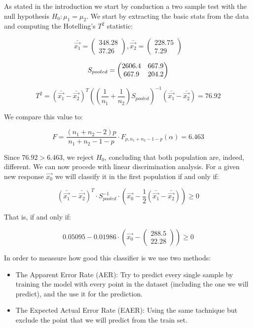 \documentclass[11pt,a4paper]{article}
\begin{document}
	As stated in the introduction we start by conduction a two sample test with the null hypothesis $H_0: \mu_1 = \mu_2$. We start by extracting the basic stats from the data and computing the Hotelling's $T^2$ statistic:
	
	$$ \bar{\vec{x_1}} = 
	\begin{pmatrix}
	348.28  \\         
	37.26
	\end{pmatrix} 
	, \bar{\vec{x_2}} = 
	\begin{pmatrix}
	228.75  \\         
	7.29
	\end{pmatrix} 
	$$
	
	$$ S_{pooled} = 
	\begin{pmatrix}
		\multicolumn{1}{c}{2606.4} & \multicolumn{1}{c}{667.9} \\
		667.9                      & 204.2                    
	\end{pmatrix} 
	$$ 
	
	$$ T^2 = (\bar{\vec{x_1}} - \bar{\vec{x_2}})^T ((\frac{1}{n_1} + \frac{1}{n_2}) S_{pooled})^{-1} (\bar{\vec{x_1}} - \bar{\vec{x_2}}) = 76.92 $$ 
	
	We compare this value to:
	
	$$ F = \frac{(n_1 + n_2 - 2)p}{n_1+n_2-1-p} \cdot F_{p, n_1+n_2-1-p}(\alpha) = 6.463 $$
	
	Since $76.92 > 6.463$, we reject $H_0$, concluding that both population are, indeed, different. We can now procede with linear discrimination analysis. For a given new response $\vec{x_0}$ we will classify it in the first population if and only if:
	
	$$ (\bar{\vec{x_1}} - \bar{\vec{x_2}})^T \cdot S_{pooled}^{-1} \cdot (\vec{x_0} - \frac{1}{2}(\bar{\vec{x_1}} - \bar{\vec{x_2}})) \ge 0 $$
	
	That is, if and only if:
	
	$$ 0.05095 - 0.01986 \cdot (\vec{x_0} - \begin{pmatrix}
	288.5 \\
	22.28
	\end{pmatrix} ) \ge 0 $$
	
	In order to meassure how good this classifier is we use two methods:
	
	\begin{itemize}
		\item The Apparent Error Rate (AER): Try to predict every single sample by training the model with every point in the dataset (including the one we will predict), and the use it for the prediction.
		\item The Expected Actual Error Rate (EAER): Using the same tachnique but exclude the point that we will predict from the train set.
	\end{itemize}
\end{document}
